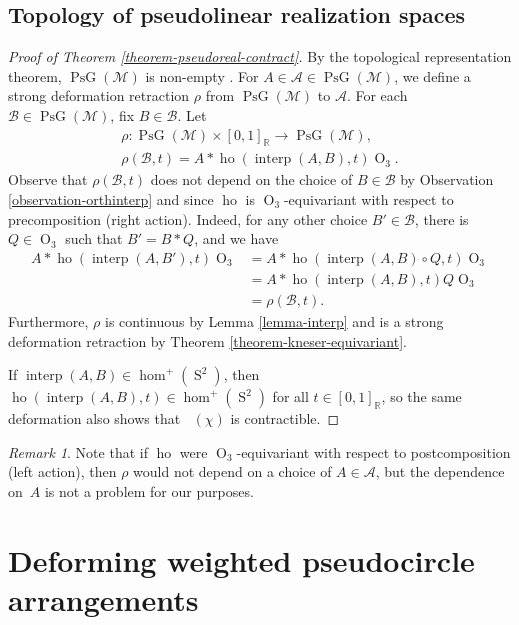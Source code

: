 \documentclass[11pt]{article}
\newcommand{\Subsection}{\subsection}
\numberwithin{equation}{section}
\theoremstyle{remark}
\newtheorem{remark}[theorem]{Remark}
\let\mc\mathcal
\let\mb\mathbb
\DeclareMathOperator{\realo}{PsG}
\DeclareMathOperator{\pog}{Ps\widetilde G}
\DeclareMathOperator{\orth}{O}
\DeclareMathOperator{\sphere}{S}
\DeclareMathOperator{\interp}{interp}
\DeclareMathOperator{\ho}{ho}
\begin{document}
\Subsection{Topology of pseudolinear realization spaces}

\begin{proof}[Proof of Theorem \ref{theorem-pseudoreal-contract}]
By the topological representation theorem, $\realo(\mc{M})$ is non-empty \cite{folkman1978oriented}.
For $A \in \mc{A} \in \realo(\mc{M})$, we define a strong deformation retraction $\rho$ from $\realo(\mc{M})$ to $\mc{A}$.
For each $\mc{B} \in \realo(\mc{M})$, fix $B \in \mc{B}$. Let
\begin{gather*}
\rho : \realo(\mc{M}) \times [0,1]_\mb{R} \to \realo(\mc{M}),\\\rho(\mc{B},t) = A*\ho(\interp(A,B),t)\orth_3.
\end{gather*}
Observe that $\rho(\mc{B},t)$ does not depend on the choice of $B \in \mc{B}$ by Observation \ref{observation-orthinterp} and since $\ho$ is $\orth_3$-equivariant with respect to precomposition (right action). Indeed, for any other choice $B' \in \mc{B}$, there is $Q \in \orth_3$ such that $B' = B*Q$, and we have
\begin{align*}
A*\ho(\interp(A,B'),t)\orth_3
&= A*\ho(\interp(A,B) \circ Q,t)\orth_3 \\
&= A*\ho(\interp(A,B),t)Q\orth_3 \\
&= \rho(\mc{B},t).
\end{align*}
Furthermore, $\rho$ is continuous by Lemma \ref{lemma-interp} and is a strong deformation retraction by Theorem \ref{theorem-kneser-equivariant}.

If $\interp(A,B) \in \hom^+(\sphere^2)$, then $\ho(\interp(A,B),t) \in \hom^+(\sphere^2)$ for all $t \in [0,1]_\mb{R}$,
so the same deformation also shows that $\pog(\chi)$ is contractible.
\end{proof}

\begin{remark}
Note that if $\ho$ were $\orth_3$-equivariant with respect to postcomposition (left action), then $\rho$ would not depend on a choice of $A \in \mc{A}$, but the dependence on~$A$ is not a problem for our purposes.
\end{remark}

\section{Deforming weighted pseudocircle arrangements}\label{section-deforming}
\end{document}
